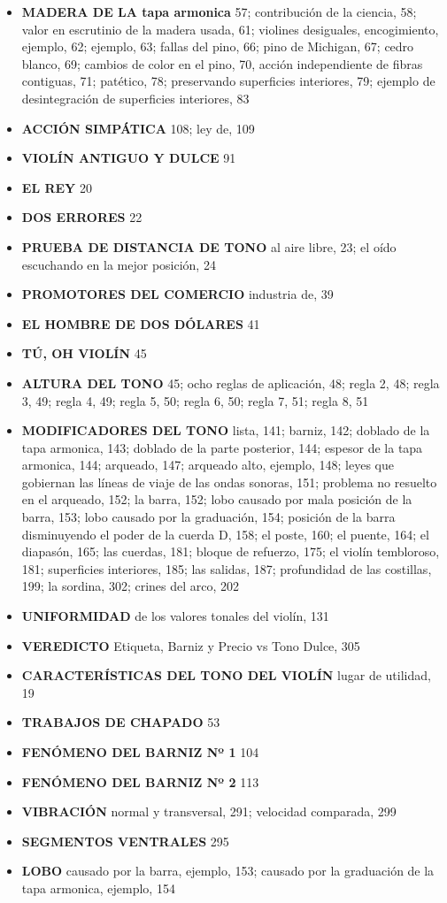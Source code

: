 \documentclass[12pt]{book}
\begin{document}
\begin{itemize}
    \item \textbf{MADERA DE LA tapa armonica} 57; contribución de la ciencia, 58; valor en escrutinio de la madera usada, 61; violines desiguales, encogimiento, ejemplo, 62; ejemplo, 63; fallas del pino, 66; pino de Michigan, 67; cedro blanco, 69; cambios de color en el pino, 70, acción independiente de fibras contiguas, 71; patético, 78; preservando superficies interiores, 79; ejemplo de desintegración de superficies interiores, 83
    \item \textbf{ACCIÓN SIMPÁTICA} 108; ley de, 109
    \item \textbf{VIOLÍN ANTIGUO Y DULCE} 91
    \item \textbf{EL REY} 20
    \item \textbf{DOS ERRORES} 22
    \item \textbf{PRUEBA DE DISTANCIA DE TONO} al aire libre, 23; el oído escuchando en la mejor posición, 24
    \item \textbf{PROMOTORES DEL COMERCIO} industria de, 39
    \item \textbf{EL HOMBRE DE DOS DÓLARES} 41
    \item \textbf{TÚ, OH VIOLÍN} 45
    \item \textbf{ALTURA DEL TONO} 45; ocho reglas de aplicación, 48; regla 2, 48; regla 3, 49; regla 4, 49; regla 5, 50; regla 6, 50; regla 7, 51; regla 8, 51
    \item \textbf{MODIFICADORES DEL TONO} lista, 141; barniz, 142; doblado de la tapa armonica, 143; doblado de la parte posterior, 144; espesor de la tapa armonica, 144; arqueado, 147; arqueado alto, ejemplo, 148; leyes que gobiernan las líneas de viaje de las ondas sonoras, 151; problema no resuelto en el arqueado, 152; la barra, 152; lobo causado por mala posición de la barra, 153; lobo causado por la graduación, 154; posición de la barra disminuyendo el poder de la cuerda D, 158; el poste, 160; el puente, 164; el diapasón, 165; las cuerdas, 181; bloque de refuerzo, 175; el violín tembloroso, 181; superficies interiores, 185; las salidas, 187; profundidad de las costillas, 199; la sordina, 302; crines del arco, 202
    \item \textbf{UNIFORMIDAD} de los valores tonales del violín, 131
    \item \textbf{VEREDICTO} Etiqueta, Barniz y Precio vs Tono Dulce, 305
    \item \textbf{CARACTERÍSTICAS DEL TONO DEL VIOLÍN} lugar de utilidad, 19
    \item \textbf{TRABAJOS DE CHAPADO} 53
    \item \textbf{FENÓMENO DEL BARNIZ Nº 1} 104
    \item \textbf{FENÓMENO DEL BARNIZ Nº 2} 113
    \item \textbf{VIBRACIÓN} normal y transversal, 291; velocidad comparada, 299
    \item \textbf{SEGMENTOS VENTRALES} 295
    \item \textbf{LOBO} causado por la barra, ejemplo, 153; causado por la graduación de la tapa armonica, ejemplo, 154
\end{itemize}
\end{document}
